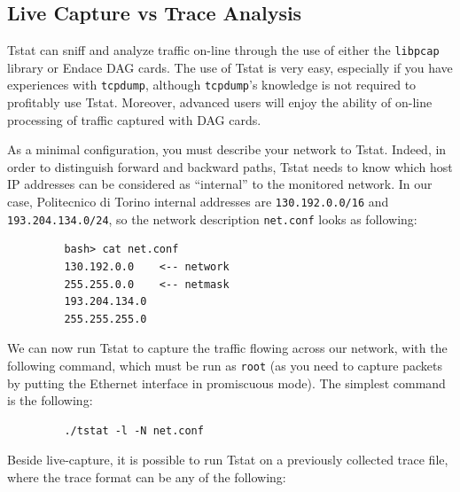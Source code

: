 \documentclass[11pt]{article}
\begin{document}
\subsection{Live Capture vs Trace Analysis\label{Live_Capture_vs_Trace_Analysis}}


Tstat can sniff and analyze traffic on-line through the
use of either the \texttt{libpcap} library or Endace DAG cards. 
The use of Tstat is very easy, especially if you have
experiences with \texttt{tcpdump}, although \texttt{tcpdump}'s knowledge
is not required to profitably use Tstat. Moreover, advanced 
users will enjoy the ability of on-line processing of traffic
captured with DAG cards.



As a minimal configuration, you must describe your network to Tstat. Indeed, in
order to distinguish forward and backward paths, Tstat needs  to know which host
IP addresses can be considered as ``internal'' to the monitored network. In our
case, Politecnico di Torino internal addresses are \texttt{130.192.0.0/16} and
\texttt{193.204.134.0/24}, so the network description \texttt{net.conf} looks as following:

\begin{small}\begin{verbatim}
         bash> cat net.conf
         130.192.0.0    <-- network
         255.255.0.0    <-- netmask
         193.204.134.0  
         255.255.255.0
\end{verbatim}\end{small} \noindent
We can now run Tstat to capture the traffic flowing across 
our network, with the following command, which must be run as \texttt{root} (as you
need to capture packets by putting the Ethernet interface in promiscuous mode).
The simplest command is the following:

\begin{small}\begin{verbatim}
         ./tstat -l -N net.conf
\end{verbatim}\end{small} \noindent
Beside live-capture, it is possible to run Tstat on a previously collected 
trace file, where the trace format can be any of the following:
\end{document}
